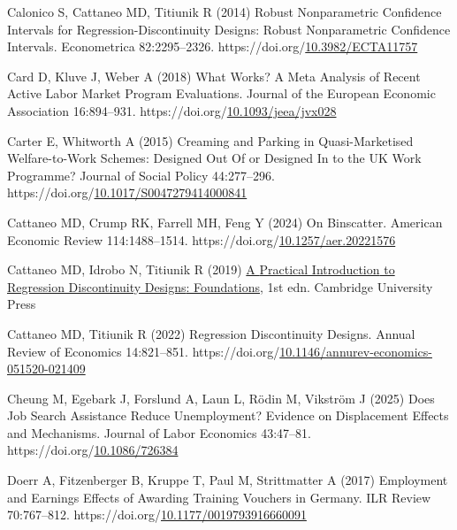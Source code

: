\documentclass[
  11pt]{article}
\newlength{\cslhangindent}
\newenvironment{CSLReferences}[2] %
 {\begin{list}{}{%
  \setlength{\itemindent}{0pt}
  \setlength{\leftmargin}{0pt}
  \setlength{\parsep}{0pt}
  \ifodd #1
   \setlength{\leftmargin}{\cslhangindent}
   \setlength{\itemindent}{-1\cslhangindent}
  \fi
  \setlength{\itemsep}{#2\baselineskip}}}
 {\end{list}}
\begin{document}
\begin{CSLReferences}{1}{1}
Calonico S, Cattaneo MD, Titiunik R (2014) Robust {Nonparametric
Confidence Intervals} for {Regression-Discontinuity Designs}: {Robust
Nonparametric Confidence Intervals}. Econometrica 82:2295--2326.
https://doi.org/\href{https://doi.org/10.3982/ECTA11757}{10.3982/ECTA11757}

Card D, Kluve J, Weber A (2018) What {Works}? {A Meta Analysis} of
{Recent Active Labor Market Program Evaluations}. Journal of the
European Economic Association 16:894--931.
https://doi.org/\href{https://doi.org/10.1093/jeea/jvx028}{10.1093/jeea/jvx028}

Carter E, Whitworth A (2015) Creaming and {Parking} in {Quasi-Marketised
Welfare-to-Work Schemes}: {Designed Out Of} or {Designed In} to the {UK
Work Programme}? Journal of Social Policy 44:277--296.
https://doi.org/\href{https://doi.org/10.1017/S0047279414000841}{10.1017/S0047279414000841}

Cattaneo MD, Crump RK, Farrell MH, Feng Y (2024) On {Binscatter}.
American Economic Review 114:1488--1514.
https://doi.org/\href{https://doi.org/10.1257/aer.20221576}{10.1257/aer.20221576}

Cattaneo MD, Idrobo N, Titiunik R (2019)
\href{https://doi.org/10.1017/9781108684606}{A {Practical Introduction}
to {Regression Discontinuity Designs}: {Foundations}}, 1st edn.
Cambridge University Press

Cattaneo MD, Titiunik R (2022) Regression {Discontinuity Designs}.
Annual Review of Economics 14:821--851.
https://doi.org/\href{https://doi.org/10.1146/annurev-economics-051520-021409}{10.1146/annurev-economics-051520-021409}

Cheung M, Egebark J, Forslund A, Laun L, Rödin M, Vikström J (2025) Does
{Job Search Assistance Reduce Unemployment}? {Evidence} on {Displacement
Effects} and {Mechanisms}. Journal of Labor Economics 43:47--81.
https://doi.org/\href{https://doi.org/10.1086/726384}{10.1086/726384}

Doerr A, Fitzenberger B, Kruppe T, Paul M, Strittmatter A (2017)
Employment and {Earnings Effects} of {Awarding Training Vouchers} in
{Germany}. ILR Review 70:767--812.
https://doi.org/\href{https://doi.org/10.1177/0019793916660091}{10.1177/0019793916660091}


\end{CSLReferences}
\end{document}
